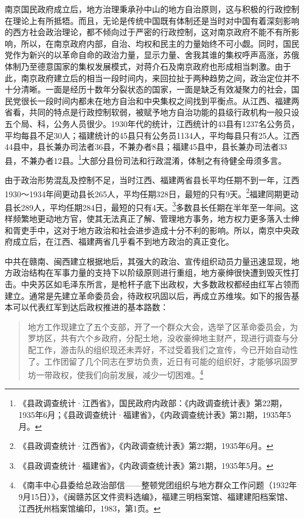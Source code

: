 南京国民政府成立后，地方治理秉承孙中山的地方自治原则，这与积极的行政控制在理论上有所抵牾。而且，无论是传统中国既有体制还是当时对中国有着深刻影响的西方社会政治理论，都不倾向过于严密的行政控制，这对南京政府不能不有所影响，所以，在南京政府内部，自治、均权和民主的力量始终不可小觑。同时，国民党作为新兴的以革命自命的政治力量，显示力量、舍我其谁的集权呼声高涨，苏俄体制乃至德意国家的集权发展模式，对蒋介石及南京政府也形成相当刺激。由于此，南京政府建立后的相当一段时间内，来回拉扯于两种趋势之间，政治定位并不十分清晰。一面是经历十数年分裂状态的国家，一面是缺乏有效凝聚力的社会，国民党很长一段时间内都未在地方自治和中央集权之间找到平衡点。从江西、福建两省看，共同的特点是行政控制软弱，被赋予地方自治功能的县级行政机构一般只设五个局、科，公务人员很少。1930年代的统计，江西统计的43县有1237名公务员，平均每县不足30人；福建统计的45县只有公务员1134人，平均每县只有25人。江西44县中，县长兼办司法者36县，不兼办者8县；福建45县中，县长兼办司法者33县，不兼办者12县。\footnote{《县政调查统计·江西省》，国民政府内政部：《内政调查统计表》第22期，1935年6月；《县政调查统计·福建省》，《内政调查统计表》第21期，1935年5月。}大部分县份司法和行政混淆，体制之有待健全毋须多言。


由于政治形势混乱及控制不足，当时江西、福建两省县长平均任期不到一年，江西1930～1934年间更动县长265人，平均任期328日，最短的只有9天。\footnote{《县政调查统计·江西省》，《内政调查统计表》第22期，1935年6月。}福建同期更动县长289人，平均任期284日，最短的只有4天。\footnote{《县政调查统计·福建省》，《内政调查统计表》第21期，1935年5月。}多数县长任期在半年至一年间。这样频繁地更动地方官，使其无法真正了解、管理地方事务，地方权力更多落入士绅和胥吏手中，这对于地方政治和社会进步造成十分不利的影响。所以，南京中央政府成立后，在江西、福建两省几乎看不到地方政治的真正变化。


中共在赣南、闽西建立根据地后，其强大的政治、宣传组织动员力量迅速显现，地方政治结构在军事力量的支持下以阶级原则进行重组，地方豪绅很快遭到毁灭性打击。中央苏区如毛泽东所言，是枪杆子底下出政权，大多数政权都经由红军占领而建立。通常是先建立革命委员会，待政权巩固以后，再成立苏维埃。如下的报告基本可以代表红军到达后政权推进的基本路数：

\begin{quote}

地方工作现建立了五个支部，开了一个群众大会，选举了区革命委员会，为罗坊区，共有六个乡政府，分配土地，没收豪绅地主财产，现进行调查与分配工作，游击队的组织现还未弄好，不过受着我们之宣传，今已开始自动性了。工作团留了几个同志在罗坊负责，近日有可能的组织好，才能够巩固罗坊一带政权，使我们向前发展，减少一切困难。\footnote{《南丰中心县委给总政治部信——整顿党团组织与地方群众工作问题（1932年9月15日）》，《闽赣苏区文件资料选编》，福建三明档案馆、福建建阳档案馆、江西抚州档案馆编印，1983，第1页。}
\end{quote}


